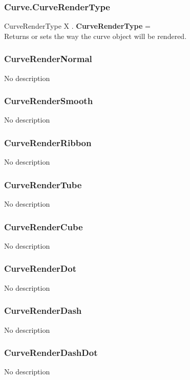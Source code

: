 \subsubsection{Curve.CurveRenderType \label{F:Curve:CurveRenderType}}
CurveRenderType X . \textbf{CurveRenderType} = \\
Returns or sets the way the curve object will be rendered.

\subsubsection{CurveRenderNormal \label{T:CurveRenderType|CurveRenderNormal}}
No description

\subsubsection{CurveRenderSmooth \label{T:CurveRenderType|CurveRenderSmooth}}
No description

\subsubsection{CurveRenderRibbon \label{T:CurveRenderType|CurveRenderRibbon}}
No description

\subsubsection{CurveRenderTube \label{T:CurveRenderType|CurveRenderTube}}
No description

\subsubsection{CurveRenderCube \label{T:CurveRenderType|CurveRenderCube}}
No description

\subsubsection{CurveRenderDot \label{T:CurveRenderType|CurveRenderDot}}
No description

\subsubsection{CurveRenderDash \label{T:CurveRenderType|CurveRenderDash}}
No description

\subsubsection{CurveRenderDashDot \label{T:CurveRenderType|CurveRenderDashDot}}
No description

